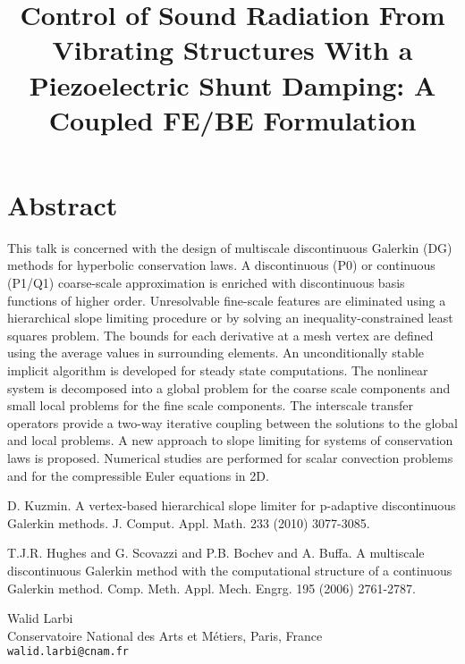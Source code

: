 \documentclass[article,A4,11pt]{llncs}%
\begin{document}
\section*{Abstract}
This talk is concerned with the design of multiscale discontinuous Galerkin (DG) methods for hyperbolic conservation laws. A discontinuous (P0) or continuous (P1/Q1) coarse-scale approximation is enriched with discontinuous basis functions of higher order. Unresolvable fine-scale features are eliminated using a hierarchical slope limiting procedure or by solving an inequality-constrained least squares problem. The bounds for each derivative at a mesh vertex are defined using the average values in surrounding elements. An unconditionally stable implicit algorithm is developed for steady state computations. The nonlinear system is decomposed into a global problem for the coarse scale components and small local problems for the fine scale components. The interscale transfer operators provide a two-way iterative coupling between the solutions to the global and local problems. A new approach to slope limiting for systems of conservation laws is proposed. Numerical studies are performed for scalar convection problems and for the compressible Euler equations in 2D.



\begin{thebibliography}{10}
{\sc D. Kuzmin}. { A vertex-based hierarchical slope limiter for p-adaptive discontinuous Galerkin methods}.  J.  Comput.  Appl.  Math.  233  (2010) 3077-3085.

{\sc  T.J.R. Hughes and G. Scovazzi and P.B. Bochev and A. Buffa}. {A multiscale discontinuous Galerkin  method with the computational structure of a continuous Galerkin method}. Comp.  Meth.  Appl.  Mech.  Engrg.  195  (2006) 2761-2787.
\end{thebibliography}

\title{Control of Sound Radiation From Vibrating Structures With a Piezoelectric Shunt Damping: A Coupled FE/BE Formulation}
 \author{} \institute{}
\maketitle
\begin{center}
{\large Walid Larbi}\\
Conservatoire National des Arts et M\'{e}tiers, Paris, France\\
{\tt walid.larbi@cnam.fr}
\end{center}
\end{document}

